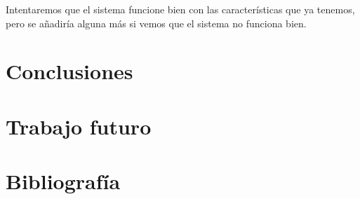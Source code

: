 \documentclass[12pt]{article}
\begin{document}
Intentaremos que el sistema funcione bien con las características que ya tenemos, pero se añadiría alguna más
si vemos que el sistema no funciona bien.

\newpage
\section{Conclusiones}
\label{Conclusiones}
\section{Trabajo futuro}
\label{Trabajo futuro}

\section{Bibliografía}
\label{Bibliografía}
\printbibliography
\end{document}
